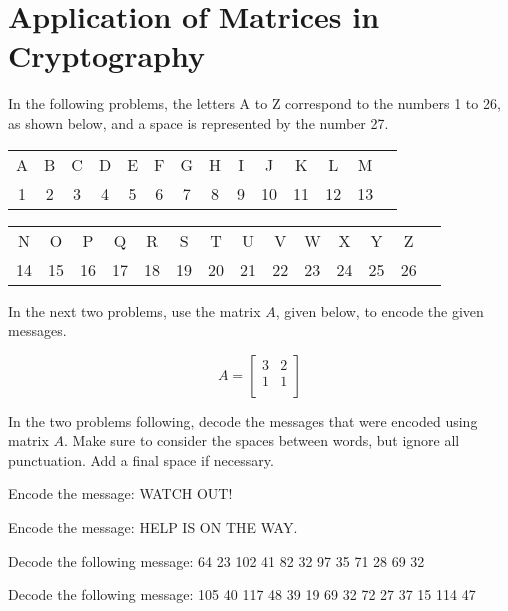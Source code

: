 \section{Application of Matrices in Cryptography}

In the following problems, the letters A to Z correspond to the numbers 1 to 26, as shown below, and a space is represented by the number 27.

\begin{center}
    \begin{tabular}{cccccccccccccc}
        A & B & C & D & E & F & G & H & I & J  & K  & L  & M  \\
        1 & 2 & 3 & 4 & 5 & 6 & 7 & 8 & 9 & 10 & 11 & 12 & 13 \\
    \end{tabular}

    \begin{tabular}{cccccccccccccc}
        N  & O  & P  & Q  & R  & S  & T  & U  & V  & W  & X  & Y  & Z  \\
        14 & 15 & 16 & 17 & 18 & 19 & 20 & 21 & 22 & 23 & 24 & 25 & 26 \\
    \end{tabular}
\end{center}

In the next two problems, use the matrix \( A \), given below, to encode the given messages.

\[ A = \begin{bmatrix}
        3 & 2 \\
        1 & 1 \\
    \end{bmatrix} \]

In the two problems following, decode the messages that were encoded using matrix \( A \).
Make sure to consider the spaces between words, but ignore all punctuation. Add a final space if necessary.


\begin{puzzle}
    Encode the message: WATCH OUT!
\end{puzzle}

\begin{puzzle}
    Encode the message: HELP IS ON THE WAY.
\end{puzzle}

\begin{puzzle}
    Decode the following message:
    64 23 102 41 82 32 97 35 71 28 69 32
\end{puzzle}

\begin{puzzle}
    Decode the following message:
    105 40 117 48 39 19 69 32 72 27 37 15 114 47
\end{puzzle}

